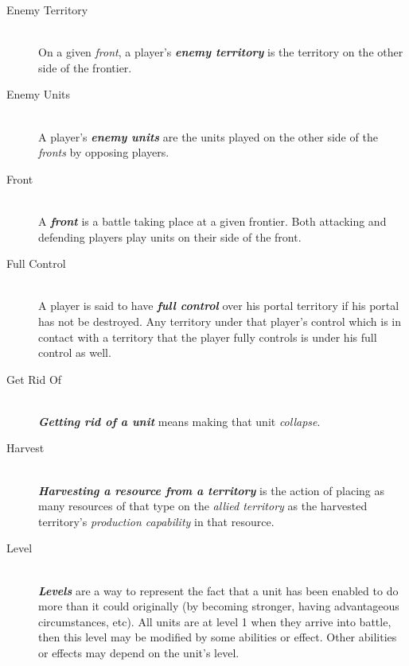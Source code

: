 \documentclass[a4paper]{article}
\begin{document}
\begin{description}
        \item[Enemy Territory] \hfill \\
            On a given \textit{front}, a player's \textbf{\textit{enemy territory}}
            is the territory on the other side of the frontier.
            
        \item[Enemy Units] \hfill \\
            A player's \textbf{\textit{enemy units}} are the units played on the other side
            of the \textit{fronts} by opposing players.
            
        \item[Front] \hfill \\
            A \textbf{\textit{front}} is a battle taking place at a given frontier.
            Both attacking and defending players play units on their side of the front.
            
        \item[Full Control] \hfill \\
            A player is said to have \textbf{\textit{full control}} over his portal territory
            if his portal has not be destroyed.
            Any territory under that player's control which is in contact with
            a territory that the player fully controls is under his full control as well.
            
        \item[Get Rid Of] \hfill \\
            \textbf{\textit{Getting rid of a unit}} means making that unit
            \textit{collapse}.
            
        \item[Harvest] \hfill \\
            \textbf{\textit{Harvesting a resource from a territory}} is the action of
            placing as many resources of that type on the \textit{allied territory}
            as the harvested territory's \textit{production capability} in that resource.
            
        \item[Level] \hfill \\
            \textbf{\textit{Levels}} are a way to represent the fact
            that a unit has been enabled to do more than it could originally
            (by becoming stronger, having advantageous circumstances, etc).
            All units are at level 1 when they arrive into battle,
            then this level may be modified by some abilities or effect.
            Other abilities or effects may depend on the unit's level.
            

\end{description}
\end{document}
